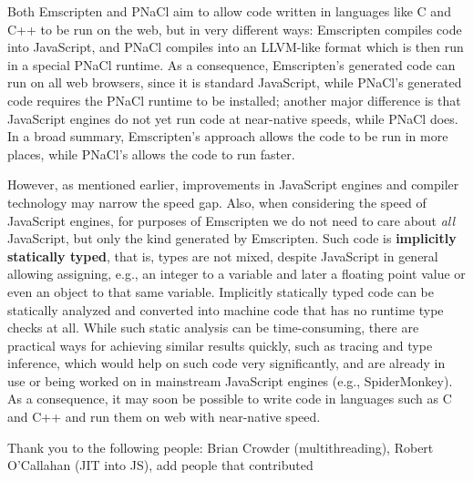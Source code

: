 \documentclass[11pt]{proc}
\begin{document}
Both Emscripten
and PNaCl aim to allow code written in languages like C and C++ to
be run on the web, but in very different ways: Emscripten compiles code into JavaScript, and
PNaCl compiles into an LLVM-like format which is then
run in a special PNaCl runtime. As a consequence, Emscripten's generated code can run on all web browsers,
since it is standard JavaScript, while PNaCl's generated code
requires the PNaCl runtime to be installed; another major
difference is that JavaScript engines do not yet run code at
near-native speeds, while PNaCl does. In a broad summary, Emscripten's
approach allows the code to be run in more places, while PNaCl's
allows the code to run faster.

However, as mentioned earlier, improvements in JavaScript engines and compiler
technology may narrow the speed
gap. Also, when considering the speed of JavaScript engines, for purposes of Emscripten we do not need to
care about \emph{all} JavaScript, but only the kind generated by
Emscripten. Such code is \textbf{implicitly statically typed}, that is,
types are not mixed, despite JavaScript in general allowing assigning, e.g., an
integer to a variable and later a floating point value or even an object to that same variable. Implicitly statically
typed code can be statically analyzed and converted into
machine code that has no runtime type checks at all. While such
static analysis can be time-consuming, there are practical ways for
achieving similar results quickly, such as tracing and type inference, which
would help on such code very significantly, and are already in use
or being worked on in mainstream JavaScript engines (e.g., SpiderMonkey). As
a consequence, it may soon be possible to write code in languages such as
C and C++ and run them on web with near-native speed.



Thank you to the following people: Brian Crowder (multithreading), Robert O'Callahan (JIT into JS), add people that contributed




\end{document}
